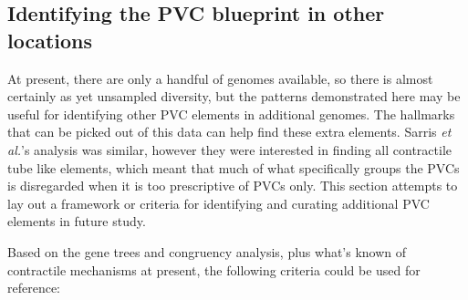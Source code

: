 \subsection{Identifying the PVC blueprint in other locations}
At present, there are only a handful of \Pa{} genomes available, so there is almost certainly as yet unsampled diversity, but the patterns demonstrated here may be useful for identifying other PVC elements in additional genomes. The hallmarks that can be picked out of this data can help find these extra elements. Sarris \emph{et al.}'s analysis was similar, however they were interested in finding all contractile tube like elements, which meant that much of what specifically groups the PVCs is disregarded when it is too prescriptive of PVCs only. This section attempts to lay out a framework or criteria for identifying and curating additional PVC elements in future study.

Based on the gene trees and congruency analysis, plus what's known of contractile mechanisms at present, the following criteria could be used for reference:

